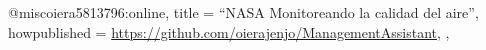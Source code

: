 @misc{oiera5813796:online,
    title = {``NASA {Monitoreando la calidad del aire}''},
    howpublished = {\url{https://github.com/oierajenjo/ManagementAssistant}},
},